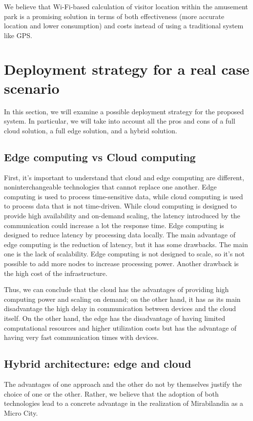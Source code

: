 We believe that Wi-Fi-based calculation of visitor location within the amusement park is a promising solution in terms of both effectiveness (more
accurate location and lower consumption) and costs instead of using a traditional system like GPS.

\section{Deployment strategy for a real case scenario}
In this section, we will examine a possible deployment strategy for the proposed system. In particular, we will take into account all the pros and
cons of a full cloud solution, a full edge solution, and a hybrid solution.

\subsection{Edge computing vs Cloud computing}
First, it's important to understand that cloud and edge computing are different, noninterchangeable technologies that cannot replace one another.
Edge computing is used to process time-sensitive data, while cloud computing is used to process data that is not time-driven. While cloud computing
is designed to provide high availability and on-demand scaling, the latency introduced by the communication could increase a lot the response time.
Edge computing is designed to reduce latency by processing data locally. The main advantage of edge computing is the reduction of latency, but it has
some drawbacks. The main one is the lack of scalability. Edge computing is not designed to scale, so it's not possible to add more nodes to increase
processing power. Another drawback is the high cost of the infrastructure.

Thus, we can conclude that the cloud has the advantages of providing high computing power and scaling on demand; on the other hand, it has as its
main disadvantage the high delay in communication between devices and the cloud itself. On the other hand, the edge has the disadvantage of having
limited computational resources and higher utilization costs but has the advantage of having very fast communication times with devices.

\subsection{Hybrid architecture: edge and cloud}
The advantages of one approach and the other do not by themselves justify the choice of one or the other. Rather, we believe that the adoption of
both technologies lead to a concrete advantage in the realization of Mirabilandia as a Micro City.

